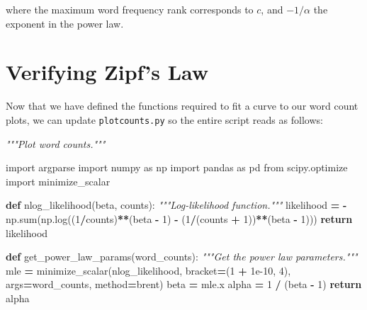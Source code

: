 \documentclass[
]{krantz}
\makeatletter
\newenvironment{Shaded}{\begin{snugshade}}{\end{snugshade}}
\newcommand{\BuiltInTok}[1]{#1}
\newcommand{\CommentTok}[1]{\textcolor[rgb]{0.56,0.35,0.01}{\textit{#1}}}
\newcommand{\ControlFlowTok}[1]{\textcolor[rgb]{0.13,0.29,0.53}{\textbf{#1}}}
\newcommand{\DecValTok}[1]{\textcolor[rgb]{0.00,0.00,0.81}{#1}}
\newcommand{\FloatTok}[1]{\textcolor[rgb]{0.00,0.00,0.81}{#1}}
\newcommand{\ImportTok}[1]{#1}
\newcommand{\KeywordTok}[1]{\textcolor[rgb]{0.13,0.29,0.53}{\textbf{#1}}}
\newcommand{\NormalTok}[1]{#1}
\newcommand{\OperatorTok}[1]{\textcolor[rgb]{0.81,0.36,0.00}{\textbf{#1}}}
\newcommand{\StringTok}[1]{\textcolor[rgb]{0.31,0.60,0.02}{#1}}
\newenvironment{kframe}{%
\medskip{}
\setlength{\fboxsep}{.8em}
 \def\at@end@of@kframe{}%
 \ifinner\ifhmode%
  \def\at@end@of@kframe{\end{minipage}}%
  \begin{minipage}{\columnwidth}%
 \fi\fi%
 \def\FrameCommand##1{\hskip\@totalleftmargin \hskip-\fboxsep
 \colorbox{shadecolor}{##1}\hskip-\fboxsep
     \hskip-\linewidth \hskip-\@totalleftmargin \hskip\columnwidth}%
 \MakeFramed {\advance\hsize-\width
   \@totalleftmargin\z@ \linewidth\hsize
   \@setminipage}}%
 {\par\unskip\endMakeFramed%
 \at@end@of@kframe}
\renewenvironment{Shaded}{\begin{kframe}}{\end{kframe}}
\makeatother
\begin{document}
where the maximum word frequency rank corresponds to \(c\),
and \(-1 / \alpha\) the exponent in the power law.

\hypertarget{git-advanced-zipf-verify}{%
\section{Verifying Zipf's Law}\label{git-advanced-zipf-verify}}

Now that we have defined the functions required to fit a curve to our word count plots,
we can update \texttt{plotcounts.py} so the entire script reads as follows:

\begin{Shaded}
\begin{Highlighting}[]
\CommentTok{"""Plot word counts."""}

\ImportTok{import}\NormalTok{ argparse}
\ImportTok{import}\NormalTok{ numpy }\ImportTok{as}\NormalTok{ np}
\ImportTok{import}\NormalTok{ pandas }\ImportTok{as}\NormalTok{ pd}
\ImportTok{from}\NormalTok{ scipy.optimize }\ImportTok{import}\NormalTok{ minimize\_scalar}


\KeywordTok{def}\NormalTok{ nlog\_likelihood(beta, counts):}
    \CommentTok{"""Log{-}likelihood function."""}
\NormalTok{    likelihood }\OperatorTok{=} \OperatorTok{{-}}\NormalTok{ np.}\BuiltInTok{sum}\NormalTok{(np.log((}\DecValTok{1}\OperatorTok{/}\NormalTok{counts)}\OperatorTok{**}\NormalTok{(beta }\OperatorTok{{-}} \DecValTok{1}\NormalTok{) }\OperatorTok{{-}}\NormalTok{ (}\DecValTok{1}\OperatorTok{/}\NormalTok{(counts }\OperatorTok{+} \DecValTok{1}\NormalTok{))}\OperatorTok{**}\NormalTok{(beta }\OperatorTok{{-}} \DecValTok{1}\NormalTok{)))}
    \ControlFlowTok{return}\NormalTok{ likelihood}


\KeywordTok{def}\NormalTok{ get\_power\_law\_params(word\_counts):}
    \CommentTok{"""Get the power law parameters."""}
\NormalTok{    mle }\OperatorTok{=}\NormalTok{ minimize\_scalar(nlog\_likelihood, bracket}\OperatorTok{=}\NormalTok{(}\DecValTok{1} \OperatorTok{+} \FloatTok{1e{-}10}\NormalTok{, }\DecValTok{4}\NormalTok{),}
\NormalTok{                          args}\OperatorTok{=}\NormalTok{word\_counts, method}\OperatorTok{=}\StringTok{\textquotesingle{}brent\textquotesingle{}}\NormalTok{)}
\NormalTok{    beta }\OperatorTok{=}\NormalTok{ mle.x}
\NormalTok{    alpha }\OperatorTok{=} \DecValTok{1} \OperatorTok{/}\NormalTok{ (beta }\OperatorTok{{-}} \DecValTok{1}\NormalTok{)}
    \ControlFlowTok{return}\NormalTok{ alpha}



\end{Highlighting}
\end{Shaded}
\end{document}

